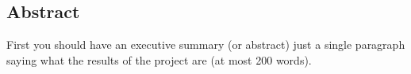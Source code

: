 \subsection*{Abstract}
First you should have an executive summary (or abstract) just a single
paragraph saying what the results of the project are (at most 200
words).
